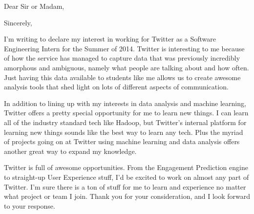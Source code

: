 \documentclass[11pt,a4paper,sans]{moderncv}        %
\title{}                               %
\begin{document}
\date{09/24/13}
\opening{Dear Sir or Madam,}
\closing{Sincerely,}
\makelettertitle

I'm writing to declare my interest in working for Twitter as a Software Engineering Intern for the Summer of 2014. Twitter is interesting to me because of how the service has managed to capture data that was previously incredibly amorphous and ambiguous, namely what people are talking about and how often. Just having this data available to students like me allows us to create awesome analysis tools that shed light on lots of different aspects of communication.

In addition to lining up with my interests in data analysis and machine learning, Twitter offers a pretty special opportunity for me to learn new things. I can learn all of the industry standard tech like Hadoop, but Twitter's internal platform for learning new things sounds like the best way to learn any tech. Plus the myriad of projects going on at Twitter using machine learning and data analysis offers another great way to expand my knowledge.

Twitter is full of awesome opportunities. From the Engagement Prediction engine to straight-up User Experience stuff, I'd be excited to work on almost any part of Twitter. I'm sure there is a ton of stuff for me to learn and experience no matter what project or team I join. Thank you for your consideration, and I look forward to your response.


\makeletterclosing
\end{document}
